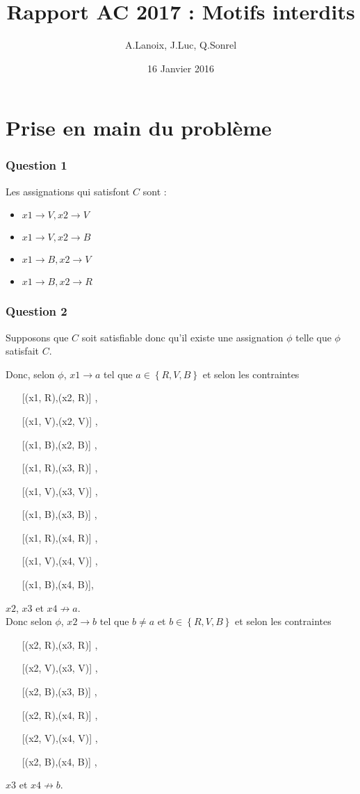 \documentclass{report}
\title{Rapport AC 2017 : Motifs interdits}
\author{A.Lanoix, J.Luc, Q.Sonrel}
\date{16 Janvier 2016}
\begin{document}
\maketitle

\section*{Prise en main du problème}
\subsubsection*{Question 1}

Les assignations qui satisfont $C$ sont :

\begin{itemize}
    \item $x1 \rightarrow V , x2 \rightarrow V$
    \item $x1 \rightarrow V , x2 \rightarrow B$
    \item $x1 \rightarrow B, x2 \rightarrow V$
    \item $x1 \rightarrow B, x2 \rightarrow R$
\end{itemize}

\subsubsection*{Question 2}

Supposons que $C$ soit satisfiable donc qu'il existe une assignation $\phi$ telle que $\phi$ satisfait $C$.

Donc, selon $\phi$, $x1 \rightarrow a$ tel que $a \in \left\{R, V, B\right\}$ et selon les contraintes
\begin{itemize}
\item[] [(x1, R),(x2, R)] ,
\item[] [(x1, V),(x2, V)] ,
\item[] [(x1, B),(x2, B)] ,
\item[] [(x1, R),(x3, R)] ,
\item[] [(x1, V),(x3, V)] ,
\item[] [(x1, B),(x3, B)] ,
\item[] [(x1, R),(x4, R)] ,
\item[] [(x1, V),(x4, V)] ,
\item[] [(x1, B),(x4, B)],
\end{itemize}

$x2$, $x3$ et $x4 \not\rightarrow a$.\\

Donc selon $\phi$, $x2 \rightarrow b$ tel que $b \neq a$ et $b \in \left\{R, V, B\right\}$ et selon les contraintes
\begin{itemize}
\item[] [(x2, R),(x3, R)] ,
\item[] [(x2, V),(x3, V)] ,
\item[] [(x2, B),(x3, B)] ,
\item[] [(x2, R),(x4, R)] ,
\item[] [(x2, V),(x4, V)] ,
\item[] [(x2, B),(x4, B)] ,
\end{itemize}
$x3$ et $x4 \not\rightarrow b$.\\
\end{document}
